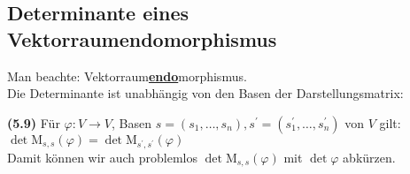 \documentclass[11pt]{scrartcl}
\newlength{\hangwidth}
\newcommand{\skript}[1]{\settowidth{\hangwidth}{\textbf{(#1)} }\hangpara{\hangwidth}{1}\textbf{(#1)} }
\begin{document}
\subsection{Determinante eines Vektorraumendomorphismus}

Man beachte: Vektorraum\textbf{\underline{endo}}morphismus. \\

Die Determinante ist unabhängig von den Basen der Darstellungsmatrix:

\skript{5.9}Für  $\varphi : V \to V$, Basen $s = (s_1, \ldots, s_n), s^\prime = (s^\prime_1, \ldots, s^\prime_n)$ von $V$ gilt: \\
$\det \textrm{M}_{s,s}(\varphi) = \det \textrm{M}_{s^\prime, s^\prime}(\varphi)$ \\

Damit können wir auch problemlos $\det \textrm{M}_{s,s}(\varphi)$ mit $\det \varphi$ abkürzen.
\end{document}
